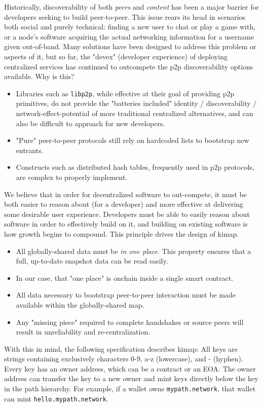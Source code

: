 \documentclass[runningheads]{llncs}
\begin{document}
Historically, discoverability of both \textit{peers} and \textit{content} has been a major barrier for developers seeking to build peer-to-peer.
This issue rears its head in scenarios both social and purely technical: finding a new user to chat or play a game with, or a node's software acquiring the actual networking information for a username given out-of-band.
Many solutions have been designed to address this problem or aspects of it, but so far, the "devex" (developer experience) of deploying centralized services has continued to outcompete the p2p discoverability options available.
Why is this?
\begin{itemize}
    \item Libraries such as \verb|libp2p|, while effective at their goal of providing p2p primitives, do not provide the "batteries included" identity / discoverability / network-effect-potential of more traditional centralized alternatives, and can also be difficult to approach for new developers.
    \item "Pure" peer-to-peer protocols still rely on hardcoded lists to bootstrap new entrants.
    \item Constructs such as distributed hash tables, frequently used in p2p protocols, are complex to properly implement.
\end{itemize}
We believe that in order for decentralized software to out-compete, it must be both easier to reason about (for a developer) and more effective at delivering some desirable user experience.
Developers must be able to easily reason about software in order to effectively build on it, and building on existing software is how growth begins to compound.
This principle drives the design of kimap.
\begin{itemize}
    \item All globally-shared data must be \textit{in one place}.
    This property ensures that a full, up-to-date snapshot data can be read easily.
    \item In our case, that "one place" is onchain inside a single smart contract.
    \item All data necessary to bootstrap peer-to-peer interaction must be made available within the globally-shared map.
    \item Any "missing piece" required to complete handshakes or source peers will result in unreliability and re-centralization.
\end{itemize}

With this in mind, the following specification describes kimap:
All keys are strings containing exclusively characters 0-9, a-z (lowercase), and - (hyphen).
Every key has an owner address, which can be a contract or an EOA. The owner address can transfer the key to a new owner and mint keys directly below the key in the path hierarchy. For example, if a wallet owns \verb|mypath.network|, that wallet can mint \verb|hello.mypath.network|.
\end{document}
